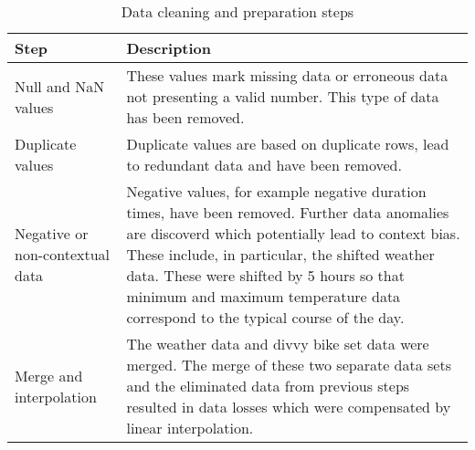 \begin{table}[H]
\centering
\begin{tabular}{p{}p{}}
\toprule
Step & Description \\
\midrule
Null and NaN values & These values mark missing data or erroneous data not presenting a valid number. This type of data has been removed.  \\
Duplicate values & Duplicate values are based on duplicate rows, lead to redundant data and have been removed. \\
Negative or non-contextual data & Negative values, for example negative duration times, have been removed. Further data anomalies are discoverd which potentially lead to context bias. These include, in particular, the shifted weather data. These were shifted by 5 hours so that minimum and maximum temperature data correspond to the typical course of the day.   \\
Merge and interpolation & The weather data and divvy bike set data were merged. The merge of these two separate data sets and the eliminated data from previous steps resulted in data losses which were compensated by linear interpolation.  \\
\bottomrule
\end{tabular}
\caption[Data cleaning and preparation steps]{Data cleaning and preparation steps}
\label{tab:dataCleaningPreparation}
\end{table} 